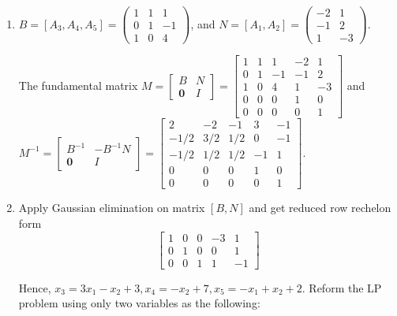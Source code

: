 \documentclass[12pt]{article}
\begin{document}
\begin{enumerate}[label = (\alph*)]
\item 

$B = [A_3, A_4, A_5] = \begin{pmatrix}
1 & 1 & 1\\
0 & 1 & -1 \\
1 & 0 & 4
\end{pmatrix}$, and $N = [A_1, A_2] = \begin{pmatrix}
-2 & 1 \\
-1 & 2 \\
1 & -3
\end{pmatrix}$.

The fundamental matrix $M = \begin{bmatrix}
B & N \\
\textbf{0} & I
\end{bmatrix} = \begin{bmatrix}
1 & 1 & 1 & -2 & 1 \\
0 & 1 & -1 & -1 & 2 \\
1 & 0 & 4 & 1 & -3 \\
0 & 0 & 0 & 1 & 0 \\
0 & 0 & 0 & 0 & 1
\end{bmatrix}$ and $M^{-1} = \begin{bmatrix}
B^{-1} & -B^{-1} N \\
\textbf{0} & I
\end{bmatrix} = \begin{bmatrix}
2 & -2 & -1 & 3 & -1 \\
-1/2 & 3/2 & 1/2 & 0 & -1 \\
-1/2 & 1/2 & 1/2 & -1 & 1 \\
0 & 0 & 0 & 1 & 0 \\
0 & 0 & 0 & 0 & 1
\end{bmatrix}$.

\item

Apply Gaussian elimination on matrix $[B, N]$ and get reduced row rechelon form
$$
\begin{bmatrix}
     1  &   0     &  0  &  -3  &   1 \\
     0  &   1 &    0  &   0  &   1 \\
     0  &   0 &    1  &   1  &  -1
     \end{bmatrix}
$$

Hence, $x_3 = 3x_1 - x_2 + 3, x_4 = -x_2 + 7, x_5 = -x_1 + x_2 + 2 $. Reform the LP problem using only two variables as the following:


\end{enumerate}
\end{document}
